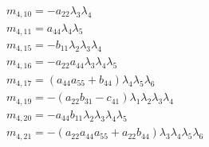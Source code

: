 \documentclass{article}
\begin{document}
\begin{align*}
&m_{4,10}=-a_{22} \lambda_{3} \lambda_{4}\\
&m_{4,11}=a_{44} \lambda_{4} \lambda_{5}\\
&m_{4,15}=-b_{11} \lambda_{2} \lambda_{3} \lambda_{4}\\
&m_{4,16}=-a_{22} a_{44} \lambda_{3} \lambda_{4} \lambda_{5}\\
&m_{4,17}={\left(a_{44} a_{55} + b_{44}\right)} \lambda_{4} \lambda_{5} \lambda_{6}\\
&m_{4,19}=-{\left(a_{22} b_{31} - c_{41}\right)} \lambda_{1} \lambda_{2} \lambda_{3} \lambda_{4}\\
&m_{4,20}=-a_{44} b_{11} \lambda_{2} \lambda_{3} \lambda_{4} \lambda_{5}\\
&m_{4,21}=-{\left(a_{22} a_{44} a_{55} + a_{22} b_{44}\right)} \lambda_{3} \lambda_{4} \lambda_{5} \lambda_{6}\\
\end{align*}
\end{document}

